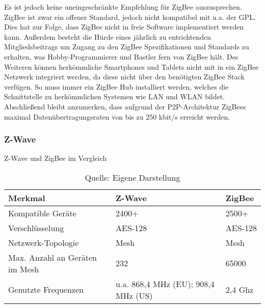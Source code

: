 Es ist jedoch keine uneingeschränkte Empfehlung für ZigBee auszusprechen.
ZigBee ist zwar ein offener Standard, jedoch nicht kompatibel mit u.a. der \ac{GPL}.
Dies hat zur Folge, dass ZigBee nicht in freie Software implementiert werden kann.
Außerdem besteht die Hürde eines jährlich zu entrichtenden Mitgliedsbeitrags um Zugang zu den ZigBee Spezifikationen und Standards zu erhalten, was Hobby-Programmierer und Bastler fern von ZigBee hält.
Des Weiteren können herkömmliche Smartphones und Tablets nicht mit in ein ZigBee Netzwerk integriert werden, da diese nicht über den benötigten ZigBee Stack verfügen.
So muss immer ein ZigBee Hub installiert werden, welches die Schnittstelle zu herkömmlichen Systemen wie \ac{LAN} und \ac{WLAN} bildet.
Abschließend bleibt anzumerken, dass aufgrund der \ac{P2P}-Architektur ZigBees maximal Datenübertragungsraten von bis zu 250 kbit/s erreicht werden.

\subsubsection{Z-Wave}



\begin{table}[ht]
	\caption{Z-Wave und ZigBee im Vergleich}
	\centering
	\begin{tabular}{| p{} | p{} | p{} |}
		\hline
		\textbf{Merkmal} 	& \textbf{Z-Wave} & \textbf{ZigBee} \\ \hline
		Kompatible Geräte & 2400+\myfootcite[Vgl.][]{zwave_product_count} & 2500+\myfootcite[Vgl.][]{zigbee_faq} \\ \hline
		Verschlüsselung & \ac{AES}-128\myfootcite[Vgl.][]{safewise_zwave_vs_zigbee} & \ac{AES}-128\myfootcite[Vgl.][]{safewise_zwave_vs_zigbee} \\ \hline
		Netzwerk-Topologie & Mesh\myfootcite[Vgl.][]{zwave_faq} & Mesh\myfootcite[Vgl.][]{zigbee_faq} \\ \hline
		Max. Anzahl an Geräten im Mesh & 232\myfootcite[Vgl.][]{zwave_faq} & 65000\myfootcite[Vgl.][]{smartcave_zwave_vs_zigbee} \\ \hline
		Genutzte Frequenzen & u.a. 868,4 MHz (EU); 908,4 MHz (US)\myfootcite[Vgl.][]{zwave_frequencies} & 2,4 Ghz\myfootcite[Vgl.][]{zigbee_faq} \\ \hline
	\end{tabular}
	\caption*{\footnotesize{Quelle: Eigene Darstellung}}
	\label{tab:zwave_vs_zigbee}
\end{table}

